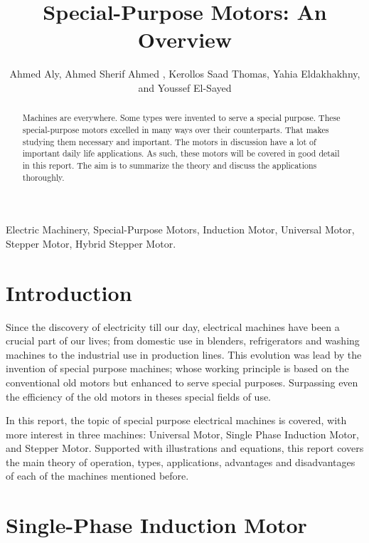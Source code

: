 \documentclass[journal]{IEEEtran}
\begin{document}
\title{Special-Purpose Motors: An Overview}
\author{Ahmed Aly, Ahmed Sherif Ahmed
, Kerollos Saad Thomas, Yahia Eldakhakhny, and Youssef El-Sayed}


\maketitle

\begin{abstract}	
Machines are everywhere. Some types were invented to serve a special purpose. These special-purpose motors excelled in many ways over their counterparts. That makes studying them necessary and important. The motors in discussion have a lot of important daily life applications. As such, these motors will be covered in good detail in this report. The aim is to summarize the theory and discuss the applications thoroughly. 
\end{abstract}


\begin{IEEEkeywords}
    Electric Machinery, Special-Purpose Motors, Induction Motor, Universal Motor, Stepper Motor, Hybrid Stepper Motor.    	
\end{IEEEkeywords}


\section{Introduction}	

Since the discovery of electricity till our day, electrical machines have been a crucial part of our lives; from domestic use in blenders, refrigerators and washing machines to the industrial use in production lines. This evolution was lead by the invention of special purpose machines; whose working principle
is based on the conventional old motors but enhanced to serve special purposes. Surpassing even the efficiency of the old motors in theses special fields of use.

In this report, the topic of special purpose electrical machines is covered, with more interest in three machines: Universal Motor, Single Phase Induction Motor, and Stepper Motor.
Supported with illustrations and equations, this report covers the main theory of operation, types, applications, advantages and disadvantages of each of the machines mentioned before.



\section{Single-Phase Induction Motor}
\end{document}
